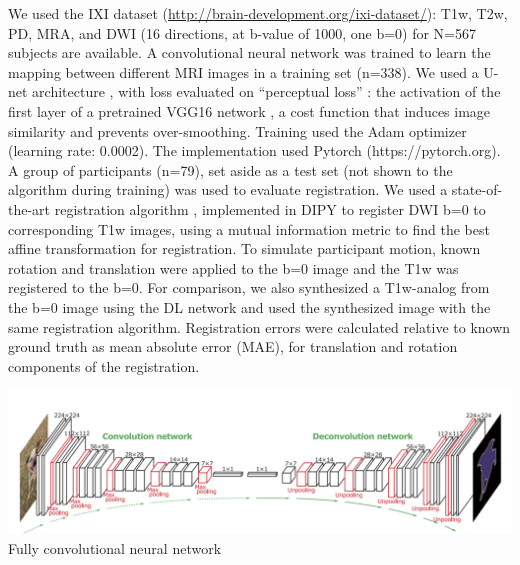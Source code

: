 \documentclass[a0, portrait]{a0poster}
\begin{document}
\begin{multicols}{2}
We used the IXI dataset (\url{http://brain-development.org/ixi-dataset/}): T1w, T2w, PD, MRA, and DWI (16 directions, at b-value of 1000, one b=0) for N=567 subjects are available. A convolutional neural network was trained to learn the mapping between different MRI images in a training set (n=338).  We used a U-net architecture \cite{Ronneberger2015-ua}, with loss evaluated on “perceptual loss” \cite{Johnson2016-ac}: the activation of the first layer of a pretrained VGG16 network \cite{Simonyan2014-ua}, a  cost function that induces image similarity and prevents over-smoothing. Training used the Adam optimizer (learning rate: 0.0002). The implementation used Pytorch (https://pytorch.org).
A group of participants (n=79), set aside as a test set (not shown to the algorithm during training) was used to evaluate registration. We used a state-of-the-art registration algorithm \cite{Avants2008-sa}, implemented in DIPY \cite{Garyfallidis2014-el} to register DWI b=0 to corresponding T1w images, using a mutual information metric to find the best affine transformation for registration. To simulate participant motion, known rotation and translation were applied to the b=0 image and the T1w was registered to the b=0. For comparison, we also synthesized a T1w-analog from the b=0 image using the DL network and used the synthesized image with the same registration algorithm. Registration errors were calculated relative to known ground truth as mean absolute error (MAE), for translation and rotation components of the registration.

\begin{minipage}[b]{\linewidth}
\includegraphics[width=\linewidth]{fully-convolutional.png}
\center Fully convolutional neural network
\end{minipage}
\\



\end{multicols}
\end{document}
